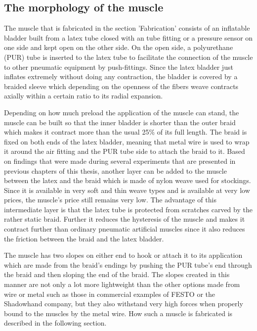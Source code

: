 \documentclass[main]{subfiles}
\begin{document}
\subsection{The morphology of the muscle}

The muscle that is fabricated in the section 'Fabrication' consists of an inflatable bladder built from a latex tube closed with an tube fitting or a pressure sensor on one side and kept open on the other side. On the open side, a polyurethane (PUR) tube is inserted to the latex tube to facilitate the connection of the muscle to other pneumatic equipment by push-fittings. Since the latex bladder just inflates extremely without doing any contraction, the bladder is covered by a braided sleeve which depending on the openness of the fibers weave contracts axially within a certain ratio to its radial expansion.

Depending on how much preload the application of the muscle can stand, the muscle can be built so that the inner bladder is shorter than the outer braid which makes it contract more than the usual 25\% of its full length. The braid is fixed on both ends of the latex bladder, meaning that metal wire is used to wrap it around the air fitting and the PUR tube side to attach the braid to it. Based on findings that were made during several experiments that are presented in previous chapters of this thesis, another layer can be added to the muscle between the latex and the braid which is made of nylon weave used for stockings. Since it is available in very soft and thin weave types and is available at very low prices, the muscle's price still remains very low. The advantage of this intermediate layer is that the latex tube is protected from scratches carved by the rather static braid. Further it reduces the hysteresis of the muscle and makes it contract further than ordinary pneumatic artificial muscles since it also reduces the friction between the braid and the latex bladder.
 
The muscle has two slopes on either end to hook or attach it to its application which are made from the braid's endings by pushing the PUR tube's end through the braid and then sloping the end of the braid. The slopes created in this manner are not only a lot more lightweight than the other options made from wire or metal such as those in commercial examples of FESTO or the Shadowhand company, but they also withstand very high forces when properly bound to the muscles by the metal wire. How such a muscle is fabricated is described in the following section.
\end{document}
